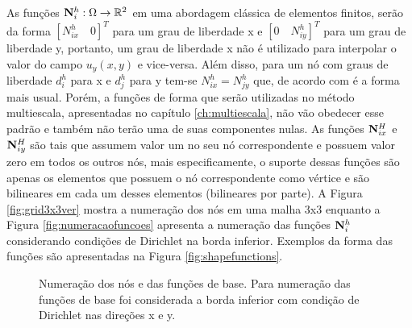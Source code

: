As funções $\basefunctionfine: \Omega \rightarrow \mathbb{R}^2$ em uma abordagem clássica de elementos finitos, serão da forma $[N^h_{ix} \quad 0]^T$ para um grau de liberdade x e  $[0 \quad N^h_{iy}]^T$  para um grau de liberdade y, portanto, um grau de liberdade x não é utilizado para interpolar o valor do campo $u_y(x, y)$ e vice-versa. Além disso, para um nó com  graus de liberdade $d^h_i$ para x e $d^h_j$ para y tem-se $N^h_{ix} = N^h_{jy}$ que, de acordo com \cite{jacob} é a forma mais usual. Porém, a funções de forma que serão utilizadas no método multiescala, apresentadas no capítulo \ref{ch:multiescala}, não vão obedecer esse padrão e também não terão uma de suas componentes nulas. As funções $\basefunctioncoarse[ix]$  e $\basefunctioncoarse[iy]$ são tais que assumem valor um no seu nó correspondente e possuem valor zero em todos os outros nós, mais especificamente, o suporte dessas funções são apenas os elementos que possuem o nó correspondente como vértice e são bilineares em cada um desses elementos (bilineares por parte). A Figura \ref{fig:grid3x3ver} mostra a numeração dos nós em uma malha 3x3 enquanto a Figura \ref{fig:numeracaofuncoes} apresenta a numeração das funções $\basefunctionfine$ considerando condições de Dirichlet na borda inferior.
Exemplos da forma das funções são apresentadas na Figura \ref{fig:shapefunctions}.


\begin{figure}[h]
\center
{}
\qquad
{}

\caption{Numeração dos nós e das funções de base. Para numeração das funções de base foi considerada a borda inferior com condição de Dirichlet nas direções x e y. }
\end{figure}


